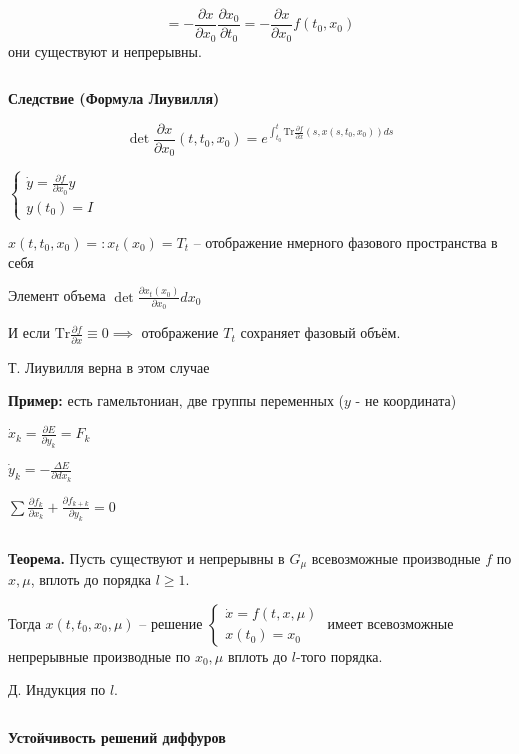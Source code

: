\documentclass[12pt, a4paper]{article}
\begin{document}
  $$= -\frac{\partial x}{\partial x_0} \frac{\partial x_0}{\partial t_0} = - \frac{\partial x}{\partial x_0} f(t_0, x_0)$$ они существуют и непрерывны.

  \par $ $

  \textbf{Следствие (Формула Лиувилля)}

  $$\det \frac{\partial x}{\partial x_0}(t, t_0, x_0) = e^{\int^t_{t_0} \text{Tr} \frac{\partial f}{\partial x}(s, x(s, t_0, x_0))ds}$$

  $\begin{cases}
    \dot y = \frac{\partial f}{\partial x_0}y\\ y(t_0) = I
    
  \end{cases}$

  $x(t, t_0, x_0) =: x_t(x_0) = T_t$ -- отображение нмерного фазового пространства в себя

  Элемент объема $\det \frac{\partial x_t(x_0)}{\partial x_0} dx_0$ 

  И если $\text{Tr} \frac{\partial f}{\partial x} \equiv 0 \implies $ отображение $T_t$ сохраняет фазовый объём.

  Т. Лиувилля верна в этом случае

  \textbf{Пример:} есть гамельтониан, две группы переменных ($y$ - не координата)
  
  $\dot x_k = \frac{\partial E}{\partial y_k} = F_k$

  $\dot y_k = - \frac{\Delta E}{\partial dx_k}$

  $\sum \frac{\partial f_k}{\partial x_k} + \frac{\partial f_{k + k}}{\partial y_k} = 0$

  \par $ $
  
  \textbf{Теорема.} Пусть существуют и непрерывны в $G_\mu$ всевозможные 
  производные $f$ по $x, \mu$, вплоть до порядка $l \ge 1$.

  Тогда $x(t, t_0, x_0, \mu)$ -- решение $\begin{cases}
    \dot x = f(t, x, \mu) \\ x(t_0) = x_0
  \end{cases}$ 
  имеет всевозможные непрерывные производные по $x_0, \mu$ вплоть до $l$-того порядка. 

  Д. Индукция по $l$.

  \par $ $

  {\large\textbf{Устойчивость решений диффуров}}
\end{document}
